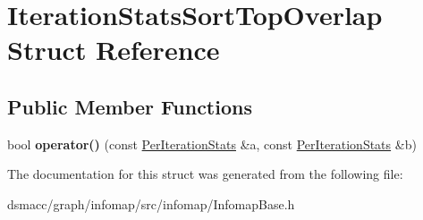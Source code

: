 \hypertarget{structIterationStatsSortTopOverlap}{}\section{Iteration\+Stats\+Sort\+Top\+Overlap Struct Reference}
\label{structIterationStatsSortTopOverlap}
\subsection*{Public Member Functions}
\begin{DoxyCompactItemize}
\item 
\mbox{\label{structIterationStatsSortTopOverlap_a7766f8d7eb7176a17db9ab65d86d4b96}} 
bool {\bfseries operator()} (const \mbox{\hyperlink{structPerIterationStats}{Per\+Iteration\+Stats}} \&a, const \mbox{\hyperlink{structPerIterationStats}{Per\+Iteration\+Stats}} \&b)
\end{DoxyCompactItemize}


The documentation for this struct was generated from the following file\+:\begin{DoxyCompactItemize}
\item 
dsmacc/graph/infomap/src/infomap/Infomap\+Base.\+h\end{DoxyCompactItemize}
